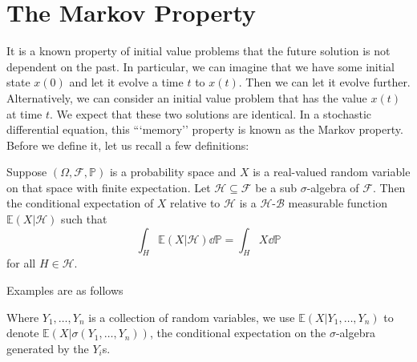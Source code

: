 \documentclass[prb,12pt]{revtex4-2}
\theoremstyle{definition}
\theoremstyle{definition}
\theoremstyle{definition}
\begin{document}
\section{The Markov Property}
It is a known property of initial value problems that the future solution is not dependent on the past. In particular, we can imagine that we have some initial state $x(0)$ and let it evolve a time $t$ to $x(t)$. Then we can let it evolve further. Alternatively, we can consider an initial value problem that has the value $x(t)$ at time $t$. We expect that these two solutions are identical. In a stochastic differential equation, this ```memory'' property is known as the Markov property. Before we define it, let us recall a few definitions:
\begin{Definition}
	Suppose $(\Omega, \mathcal{F}, \mathbb{P})$ is a probability space and $X$ is a real-valued random variable on that space with finite expectation. Let $\mathcal{H}\subseteq \mathcal{F}$ be a sub $\sigma$-algebra of $\mathcal{F}$. Then the conditional expectation of $X$ relative to $\mathcal{H}$ is a $\mathcal{H}$-$\mathcal{B}$ measurable function $\mathbb{E}(X|\mathcal{H})$ such that
	\[
		\int_H \mathbb{E}(X|\mathcal{H})\dd{\mathbb{P}}=\int_H X \dd{\mathbb{P}}
	\]
	for all $H\in \mathcal{H}$.
\end{Definition}
Examples are as follows
\begin{Example}\noindent

	\begin{center}
	\end{center}
\end{Example}
Where $Y_1, \dots, Y_n$ is a collection of random variables, we use $\mathbb{E}(X|Y_1, \dots, Y_n)$ to denote $\mathbb{E}(X|\sigma(Y_1,\dots, Y_n))$, the conditional expectation on the $\sigma$-algebra generated by the $Y_i$s.
\end{document}
